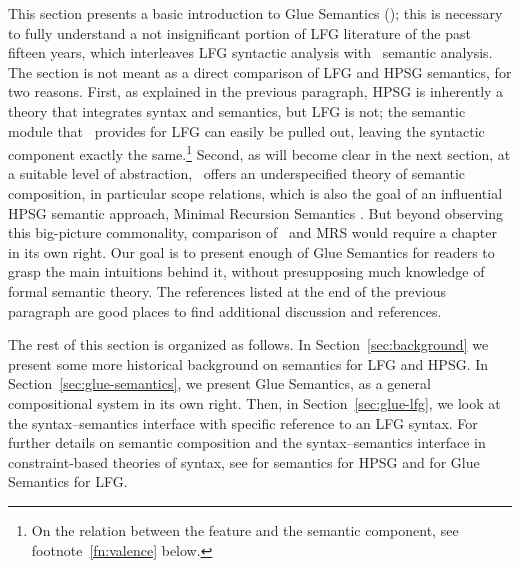 This section presents a basic introduction to Glue Semantics (\glue); this is necessary to fully understand a not insignificant portion of LFG literature of the past fifteen years, which interleaves LFG syntactic analysis with \glue\ semantic analysis. The section is not meant as a direct comparison of LFG and HPSG semantics, for two reasons. First, as explained in the previous paragraph, HPSG is inherently a theory that integrates syntax and semantics, but LFG is not; the semantic module that \glue\ provides for LFG can easily be pulled out, leaving the syntactic component exactly the same.\footnote{On the relation between the  feature and the semantic component, see footnote~\ref{fn:valence} below.} 
Second, as will become clear in the next section, at a suitable level of abstraction, \glue\ offers an underspecified theory of semantic composition, in particular scope relations, which is also the goal of an influential  HPSG semantic approach, Minimal Recursion Semantics \citep[MRS;][]{copestake;ea05}. But beyond observing this big-picture commonality, comparison of \glue\ and MRS would require a chapter in its own right.
Our goal is to present enough of Glue Semantics for readers to grasp the main intuitions behind it, without presupposing much knowledge of formal semantic theory.  The references listed at the end of the previous paragraph \citep[especially][]{dalrymple;ea19} are good places to find additional discussion and references.

The rest of this section is organized as follows. In Section~\ref{sec:background} we present some more historical background on semantics for LFG and HPSG.  In Section~\ref{sec:glue-semantics}, we present Glue Semantics, as a general compositional system in its own right. Then, in Section~\ref{sec:glue-lfg}, we look at the syntax--semantics interface with specific reference to an LFG syntax. For further details on semantic composition and the syntax--semantics interface in constraint-based theories of syntax, see  for semantics for HPSG and \citet{asudeh-lfg-glue} for Glue Semantics for LFG.

